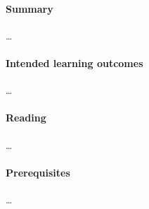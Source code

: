 \paragraph{Summary}

\dots

\paragraph{Intended learning outcomes}

\dots

\paragraph{Reading}

\dots

\paragraph{Prerequisites}

\dots

